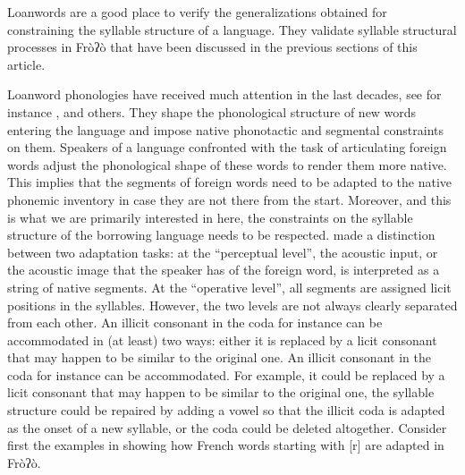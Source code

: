 \documentclass[output=paper]{langscibook}
\begin{document}
 Loanwords are a good place to verify the generalizations obtained for constraining the syllable structure of a language. They validate syllable structural processes in Fròʔò that have been discussed in the previous sections of this article.

Loanword phonologies have received much attention in the last decades, see for instance \citet{Ito1995},  \citet{Peperkamp2003} and others. They shape the phonological structure of new words entering the language and impose native phonotactic and segmental constraints on them. Speakers of a language confronted with the task of articulating foreign words adjust the phonological shape of these words to render them more native. This implies that the segments of foreign words need to be adapted to the native phonemic inventory in case they are not there from the start. Moreover, and this is what we are primarily interested in here, the constraints on the syllable structure of the borrowing language needs to be respected. \citet{Silverman1992} made a distinction between two adaptation tasks: at the ``perceptual level'', the acoustic input, or the acoustic image that the speaker has of the foreign word, is interpreted as a string of native segments. At the ``operative level'', all segments are assigned licit positions in the syllables. However, the two levels are not always clearly separated from each other. An illicit consonant in the coda for instance can be accommodated in (at least) two ways: either it is replaced by a licit consonant that may happen to be similar to the original one. An illicit consonant in the coda for instance can be accommodated. For example, it could be replaced by a licit consonant that may happen
to be similar to the original one, the syllable structure could be repaired by adding a vowel so that the illicit coda is adapted as the onset of a
new syllable, or the coda could be deleted altogether. Consider first the examples in  showing how French words starting with [r] are adapted in Fròʔò.
\end{document}
